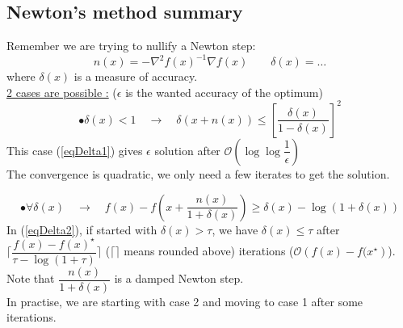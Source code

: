 \subsection{Newton's method summary}
Remember we are trying to nullify a Newton step:
$$n(x) = - \nabla^2 f(x)^{-1} \nabla f(x) \qquad \delta (x) = \dots $$
where $\delta (x)$ is a measure of accuracy.\\
\underline{2 cases are possible :} ($\epsilon$ is the wanted accuracy of the optimum)
\begin{equation}
\label{eqDelta1}
 \bullet\delta (x) < 1 \quad \rightarrow \quad \delta (x + n(x)) \leq \left[ \dfrac{\delta (x)}{1 - \delta (x)} \right]^2 
\end{equation}
This case (\ref{eqDelta1}) gives $\epsilon$ solution after $\mathcal{O} (\log \log \dfrac{1}{\epsilon})$\\
The convergence is quadratic, we only need a few iterates to get the solution.

\begin{equation}
\label{eqDelta2}
\bullet\forall \delta(x) \quad \rightarrow \quad f(x) - f\left(x + \dfrac{n(x)}{1 + \delta(x)}\right) \geq \delta(x) - \log(1 + \delta(x))
\end{equation}
In (\ref{eqDelta2}), if started with $\delta(x) > \tau $, we have $\delta(x) \leq \tau$ after $\lceil\dfrac{f(x) - f(x)^{\star}}{\tau - \log(1 + \tau)}\rceil$ ($\lceil \rceil$ means rounded above) iterations ($\mathcal{O}\left(f(x)-f(x^{\star}\right)$). \\
Note that $\dfrac{n(x)}{1 + \delta(x)}$ is a damped Newton step.\\
In practise, we are starting with case 2 and moving to case 1 after some iterations.

